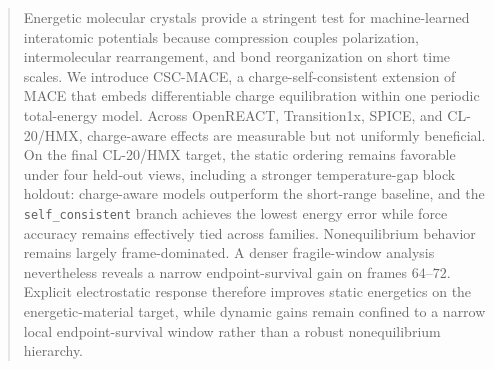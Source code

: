 \begin{abstract}
Energetic molecular crystals provide a stringent test for machine-learned interatomic potentials because compression couples polarization, intermolecular rearrangement, and bond reorganization on short time scales. We introduce CSC-MACE, a charge-self-consistent extension of MACE that embeds differentiable charge equilibration within one periodic total-energy model. Across OpenREACT, Transition1x, SPICE, and CL-20/HMX, charge-aware effects are measurable but not uniformly beneficial. On the final CL-20/HMX target, the static ordering remains favorable under four held-out views, including a stronger temperature-gap block holdout: charge-aware models outperform the short-range baseline, and the \texttt{self\_consistent} branch achieves the lowest energy error while force accuracy remains effectively tied across families. Nonequilibrium behavior remains largely frame-dominated. A denser fragile-window analysis nevertheless reveals a narrow endpoint-survival gain on frames $64$--$72$. Explicit electrostatic response therefore improves static energetics on the energetic-material target, while dynamic gains remain confined to a narrow local endpoint-survival window rather than a robust nonequilibrium hierarchy.
\end{abstract}

